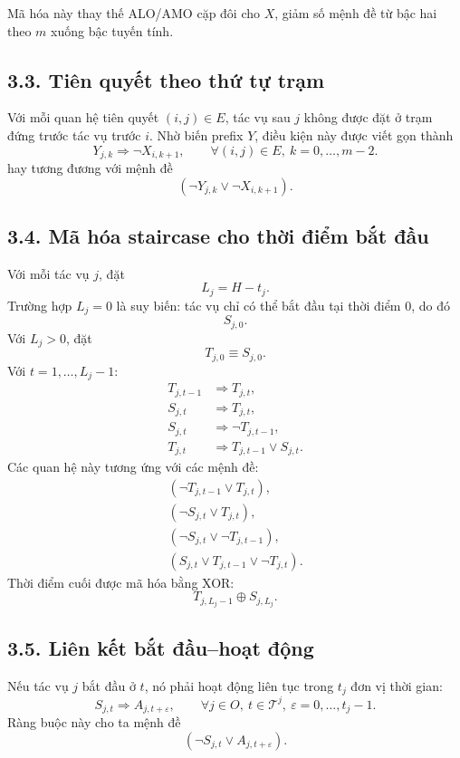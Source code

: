 \documentclass[12pt]{article}
\begin{document}
Mã hóa này thay thế ALO/AMO cặp đôi cho $X$, giảm số mệnh đề từ bậc hai theo $m$ xuống bậc tuyến tính.

\subsection*{3.3. Tiên quyết theo thứ tự trạm}

Với mỗi quan hệ tiên quyết $(i,j)\in E$, tác vụ sau $j$ không được đặt ở trạm đứng trước tác vụ trước $i$. Nhờ biến prefix $Y$, điều kiện này được viết gọn thành
\[
Y_{j,k}\Rightarrow \neg X_{i,k+1},
\qquad
\forall (i,j)\in E,\ k=0,\ldots,m-2.
\]
hay tương đương với mệnh đề
\[
(\neg Y_{j,k}\lor \neg X_{i,k+1}).
\tag{SAT\_5}
\]

\subsection*{3.4. Mã hóa staircase cho thời điểm bắt đầu}

Với mỗi tác vụ $j$, đặt
\[
L_j=H-t_j.
\]
Trường hợp $L_j=0$ là suy biến: tác vụ chỉ có thể bắt đầu tại thời điểm $0$, do đó
\[
S_{j,0}.
\]
Với $L_j>0$, đặt
\[
T_{j,0}\equiv S_{j,0}.
\]
Với $t=1,\ldots,L_j-1$:
\begin{align}
T_{j,t-1} &\Rightarrow T_{j,t}, \tag{SAT\_6}\\
S_{j,t} &\Rightarrow T_{j,t}, \tag{SAT\_7}\\
S_{j,t} &\Rightarrow \neg T_{j,t-1}, \tag{SAT\_8}\\
T_{j,t} &\Rightarrow T_{j,t-1}\lor S_{j,t}. \tag{SAT\_9}
\end{align}
Các quan hệ này tương ứng với các mệnh đề:
\begin{align}
(\neg T_{j,t-1}\lor T_{j,t}),\\
(\neg S_{j,t}\lor T_{j,t}),\\
(\neg S_{j,t}\lor \neg T_{j,t-1}),\\
(S_{j,t}\lor T_{j,t-1}\lor \neg T_{j,t}).
\end{align}
Thời điểm cuối được mã hóa bằng XOR:
\[
T_{j,L_j-1}\oplus S_{j,L_j}.
\tag{SAT\_10}
\]

\subsection*{3.5. Liên kết bắt đầu--hoạt động}

Nếu tác vụ $j$ bắt đầu ở $t$, nó phải hoạt động liên tục trong $t_j$ đơn vị thời gian:
\[
S_{j,t}\Rightarrow A_{j,t+\varepsilon},
\qquad
\forall j\in O,\ t\in\mathcal{T}^{j},\ \varepsilon=0,\ldots,t_j-1.
\]
Ràng buộc này cho ta mệnh đề
\[
(\neg S_{j,t}\lor A_{j,t+\varepsilon}).
\tag{SAT\_11}
\]
\end{document}
